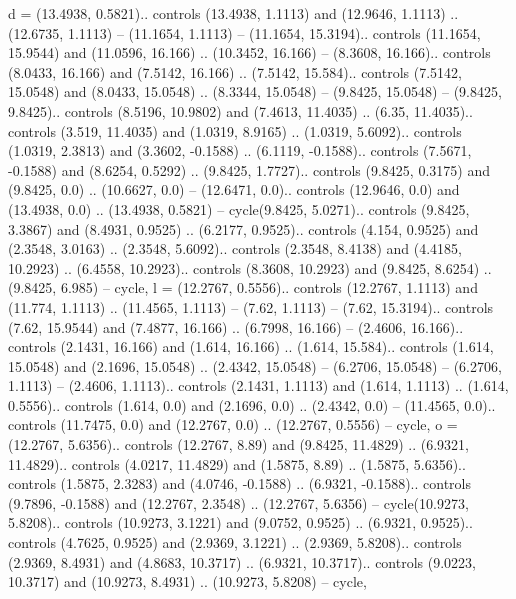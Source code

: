 {d} = {(13.4938, 0.5821).. controls (13.4938, 1.1113) and (12.9646, 1.1113) .. (12.6735, 1.1113) -- (11.1654, 1.1113) -- (11.1654, 15.3194).. controls (11.1654, 15.9544) and (11.0596, 16.166) .. (10.3452, 16.166) -- (8.3608, 16.166).. controls (8.0433, 16.166) and (7.5142, 16.166) .. (7.5142, 15.584).. controls (7.5142, 15.0548) and (8.0433, 15.0548) .. (8.3344, 15.0548) -- (9.8425, 15.0548) -- (9.8425, 9.8425).. controls (8.5196, 10.9802) and (7.4613, 11.4035) .. (6.35, 11.4035).. controls (3.519, 11.4035) and (1.0319, 8.9165) .. (1.0319, 5.6092).. controls (1.0319, 2.3813) and (3.3602, -0.1588) .. (6.1119, -0.1588).. controls (7.5671, -0.1588) and (8.6254, 0.5292) .. (9.8425, 1.7727).. controls (9.8425, 0.3175) and (9.8425, 0.0) .. (10.6627, 0.0) -- (12.6471, 0.0).. controls (12.9646, 0.0) and (13.4938, 0.0) .. (13.4938, 0.5821) -- cycle(9.8425, 5.0271).. controls (9.8425, 3.3867) and (8.4931, 0.9525) .. (6.2177, 0.9525).. controls (4.154, 0.9525) and (2.3548, 3.0163) .. (2.3548, 5.6092).. controls (2.3548, 8.4138) and (4.4185, 10.2923) .. (6.4558, 10.2923).. controls (8.3608, 10.2923) and (9.8425, 8.6254) .. (9.8425, 6.985) -- cycle},
{l} = {(12.2767, 0.5556).. controls (12.2767, 1.1113) and (11.774, 1.1113) .. (11.4565, 1.1113) -- (7.62, 1.1113) -- (7.62, 15.3194).. controls (7.62, 15.9544) and (7.4877, 16.166) .. (6.7998, 16.166) -- (2.4606, 16.166).. controls (2.1431, 16.166) and (1.614, 16.166) .. (1.614, 15.584).. controls (1.614, 15.0548) and (2.1696, 15.0548) .. (2.4342, 15.0548) -- (6.2706, 15.0548) -- (6.2706, 1.1113) -- (2.4606, 1.1113).. controls (2.1431, 1.1113) and (1.614, 1.1113) .. (1.614, 0.5556).. controls (1.614, 0.0) and (2.1696, 0.0) .. (2.4342, 0.0) -- (11.4565, 0.0).. controls (11.7475, 0.0) and (12.2767, 0.0) .. (12.2767, 0.5556) -- cycle},
{o} = {(12.2767, 5.6356).. controls (12.2767, 8.89) and (9.8425, 11.4829) .. (6.9321, 11.4829).. controls (4.0217, 11.4829) and (1.5875, 8.89) .. (1.5875, 5.6356).. controls (1.5875, 2.3283) and (4.0746, -0.1588) .. (6.9321, -0.1588).. controls (9.7896, -0.1588) and (12.2767, 2.3548) .. (12.2767, 5.6356) -- cycle(10.9273, 5.8208).. controls (10.9273, 3.1221) and (9.0752, 0.9525) .. (6.9321, 0.9525).. controls (4.7625, 0.9525) and (2.9369, 3.1221) .. (2.9369, 5.8208).. controls (2.9369, 8.4931) and (4.8683, 10.3717) .. (6.9321, 10.3717).. controls (9.0223, 10.3717) and (10.9273, 8.4931) .. (10.9273, 5.8208) -- cycle},
